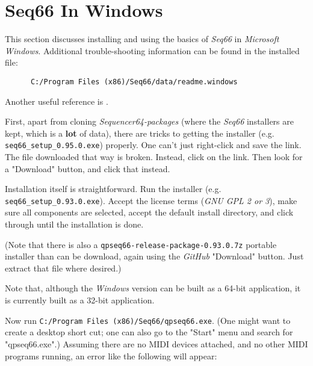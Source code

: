 %
%
%

\section{Seq66 In Windows}
\label{sec:windows}

   This section discusses installing and using the basics of \textsl{Seq66}
   in \textsl{Microsoft Windows}.  Additional trouble-shooting information can be
   found in the installed file:

   \begin{verbatim}
      C:/Program Files (x86)/Seq66/data/readme.windows
   \end{verbatim}

   Another useful reference is \cite{windowsmidi}.

   First, apart from cloning \textsl{Sequencer64-packages} (where the
   \textsl{Seq66} installers are kept, which is a \textbf{lot}
   of data), there are tricks to getting the installer
   (e.g. \texttt{seq66\_setup\_0.95.0.exe}) properly. 
   One can't just right-click and save the link.
   The file downloaded that way is broken.
   Instead, click on the link.  Then look for a "Download" button, and
   click that instead.

   Installation itself is straightforward.  Run the installer (e.g.
   \texttt{seq66\_setup\_0.93.0.exe}).  Accept the license terms (\textsl{GNU
   GPL 2 or 3}), make sure all components are selected, accept the default
   install directory, and click through until the installation is done.

   (Note that there is also a
   \texttt{qpseq66-release-package-0.93.0.7z} portable installer
   than can be download, again using the \textsl{GitHub} "Download" button.
   Just extract that file where desired.)

   Note that, although the \textsl{Windows} version can be built as a 64-bit
   application, it is currently built as a 32-bit application.

   Now run 
   \texttt{C:/Program Files (x86)/Seq66/qpseq66.exe}.
   (One might want to create a desktop short cut; one can also go to the
   "Start" menu and search for "qpseq66.exe".)
   Assuming there are no MIDI devices attached, and no other MIDI programs
   running, an error like the following will appear:

